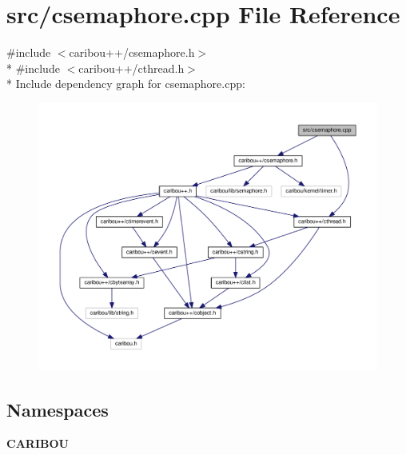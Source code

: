 \section{src/csemaphore.cpp File Reference}
\label{csemaphore_8cpp}
{\ttfamily \#include $<$caribou++/csemaphore.\-h$>$}\\*
{\ttfamily \#include $<$caribou++/cthread.\-h$>$}\\*
Include dependency graph for csemaphore.\-cpp\-:\nopagebreak
\begin{figure}[H]
\begin{center}
\leavevmode
\includegraphics[width=350pt]{csemaphore_8cpp__incl}
\end{center}
\end{figure}
\subsection*{Namespaces}
\begin{DoxyCompactItemize}
\item 
{\bf C\-A\-R\-I\-B\-O\-U}
\end{DoxyCompactItemize}
